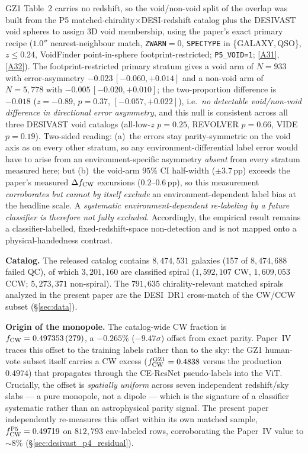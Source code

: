 \documentclass[aps,prd,twocolumn,superscriptaddress,showpacs,preprintnumbers,nofootinbib,longbibliography,floatfix]{revtex4-2}
\newcommand{\repoBase}{https://github.com/Hubify-Projects/bigbounce/blob/main}
\begin{document}
GZ1 Table~2 carries no redshift, so the void/non-void split of the overlap
was built from the P5 matched-chirality$\times$DESI-redshift catalog plus the
DESIVAST void spheres to assign 3D void membership, using the paper's exact
primary recipe ($1.0''$ nearest-neighbour match, \texttt{ZWARN}$=0$,
\texttt{SPECTYPE} in \{GALAXY,\,QSO\}, $z\le0.24$, VoidFinder point-in-sphere
footprint-restricted; \texttt{P5\_VOID=1};
\href{\repoBase/pipelines/p2\_chirality/outputs/gz1\_stratified\_confusion.json}{[A31]},
\href{\repoBase/pipelines/p2\_chirality/scripts/gz1\_stratified\_confusion.py}{[A32]}).
The footprint-restricted primary stratum gives a void arm of $N=933$ with
error-asymmetry $-0.023\,[-0.060,+0.014]$ and a non-void arm of $N=5{,}778$
with $-0.005\,[-0.020,+0.010]$; the two-proportion difference is $-0.018$
($z=-0.89$, $p=0.37$, $[-0.057,+0.022]$), i.e.\ \emph{no detectable
void/non-void difference in directional error asymmetry}, and this null is
consistent across all three DESIVAST void catalogs (all-low-$z$ $p=0.25$,
REVOLVER $p=0.66$, VIDE $p=0.19$). Two-sided reading: (a)~the errors stay
parity-symmetric on the void axis as on every other stratum, so any
environment-differential label error would have to arise from an
environment-specific asymmetry \emph{absent} from every stratum measured
here; but (b)~the void-arm $95\%$ CI half-width ($\pm3.7$\,pp) exceeds the
paper's measured $\Delta f_{\rm CW}$ excursions ($0.2$--$0.6$\,pp), so this measurement
\emph{corroborates but cannot by itself exclude} an environment-dependent
label bias at the headline scale. A \emph{systematic
environment-dependent re-labeling by a future classifier is therefore
not fully excluded}. Accordingly, the empirical result remains a
classifier-labelled, fixed-redshift-space non-detection and is not mapped
onto a physical-handedness contrast.

\textbf{Catalog.} The released catalog contains $8{,}474{,}531$
galaxies (157 of $8{,}474{,}688$ failed QC), of which $3{,}201{,}160$
are classified spiral ($1{,}592{,}107$ CW, $1{,}609{,}053$ CCW;
$5{,}273{,}371$ non-spiral). The $791{,}635$ chirality-relevant matched
spirals analyzed in the present paper are the DESI~DR1 cross-match of
the CW/CCW subset (\S\ref{sec:data}).

\textbf{Origin of the monopole.} The catalog-wide CW fraction is
$f_{\rm CW}=0.497353\,(279)$, a $-0.265\%$ ($-9.47\sigma$) offset from
exact parity. Paper~IV traces this offset to the training labels rather
than to the sky: the GZ1 human-vote subset itself carries a CW excess
($f_{\rm CW}^{\rm GZ1}=0.4838$ versus the production $0.4974$) that
propagates through the CE-ResNet pseudo-labels into the ViT. Crucially,
the offset is \emph{spatially uniform} across seven independent
redshift/sky slabs --- a pure monopole, not a dipole --- which is the
signature of a classifier systematic rather than an astrophysical parity
signal. The present paper independently re-measures this offset within
its own matched sample, $f_{\rm CW}^{\rm P5}=0.49719$ on $812{,}793$
env-labeled rows, corroborating the Paper~IV value to ${\sim}8\%$
(\S\ref{sec:desivast_p4_residual}).
\end{document}
